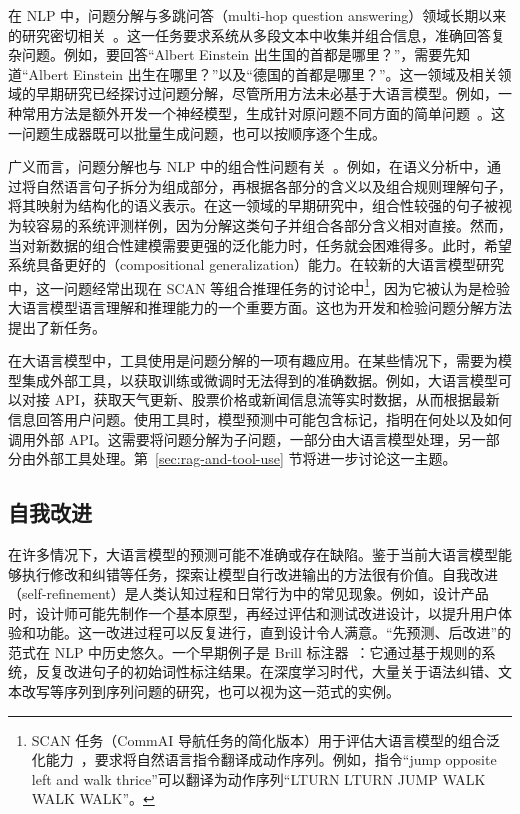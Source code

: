 在 NLP 中，问题分解与多跳问答（multi-hop question answering）领域长期以来的研究密切相关~\cite{mavi-etal:2024multi}。这一任务要求系统从多段文本中收集并组合信息，准确回答复杂问题。例如，要回答“Albert Einstein 出生国的首都是哪里？”，需要先知道“Albert Einstein 出生在哪里？”以及“德国的首都是哪里？”。这一领域及相关领域的早期研究已经探讨过问题分解，尽管所用方法未必基于大语言模型。例如，一种常用方法是额外开发一个神经模型，生成针对原问题不同方面的简单问题~\cite{andreas-etal:2016neural,talmor-etal:2018web,min-etal:2019multi}。这一问题生成器既可以批量生成问题，也可以按顺序逐个生成。

广义而言，问题分解也与 NLP 中的组合性问题有关~\cite{drozdov-etal:2022compositional,press-etal:2023measuring}。例如，在语义分析中，通过将自然语言句子拆分为组成部分，再根据各部分的含义以及组合规则理解句子，将其映射为结构化的语义表示。在这一领域的早期研究中，组合性较强的句子被视为较容易的系统评测样例，因为分解这类句子并组合各部分含义相对直接。然而，当对新数据的组合性建模需要更强的泛化能力时，任务就会困难得多。此时，希望系统具备更好的（compositional generalization）能力。在较新的大语言模型研究中，这一问题经常出现在 SCAN 等组合推理任务的讨论中\footnote{SCAN 任务（CommAI 导航任务的简化版本）用于评估大语言模型的组合泛化能力~\cite{lake-etal:2018generalization}，要求将自然语言指令翻译成动作序列。例如，指令“jump opposite left and walk thrice”可以翻译为动作序列“LTURN LTURN JUMP WALK WALK WALK”。}，因为它被认为是检验大语言模型语言理解和推理能力的一个重要方面。这也为开发和检验问题分解方法提出了新任务。

在大语言模型中，工具使用是问题分解的一项有趣应用。在某些情况下，需要为模型集成外部工具，以获取训练或微调时无法得到的准确数据。例如，大语言模型可以对接 API，获取天气更新、股票价格或新闻信息流等实时数据，从而根据最新信息回答用户问题。使用工具时，模型预测中可能包含标记，指明在何处以及如何调用外部 API。这需要将问题分解为子问题，一部分由大语言模型处理，另一部分由外部工具处理。第~\ref{sec:rag-and-tool-use} 节将进一步讨论这一主题。

\subsection{自我改进}
\label{sec:self-refinement}

\noindent 在许多情况下，大语言模型的预测可能不准确或存在缺陷。鉴于当前大语言模型能够执行修改和纠错等任务，探索让模型自行改进输出的方法很有价值。自我改进（self-refinement）是人类认知过程和日常行为中的常见现象。例如，设计产品时，设计师可能先制作一个基本原型，再经过评估和测试改进设计，以提升用户体验和功能。这一改进过程可以反复进行，直到设计令人满意。“先预测、后改进”的范式在 NLP 中历史悠久。一个早期例子是 Brill 标注器~\cite{brill:1992simple}：它通过基于规则的系统，反复改进句子的初始词性标注结果。在深度学习时代，大量关于语法纠错、文本改写等序列到序列问题的研究，也可以视为这一范式的实例。


